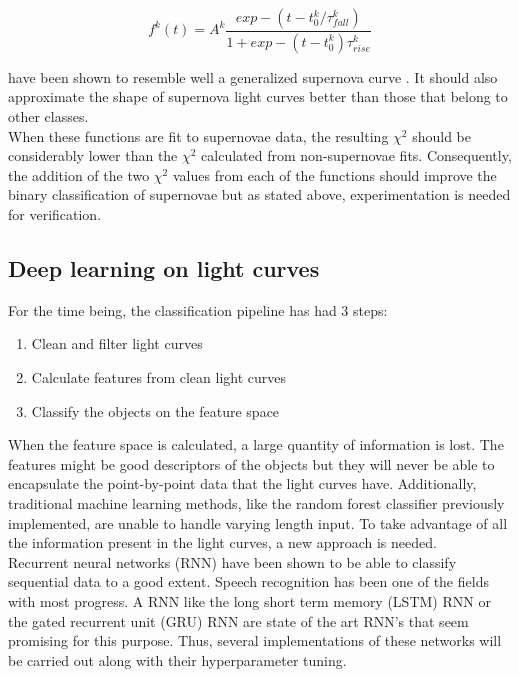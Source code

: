 \[f^k(t) = A^k \frac{exp-(t-t_0^k/\tau^k_{fall})}{1+exp-(t-t^k_0)\tau^k_{rise}}\]

have been shown to resemble well a generalized supernova curve \cite{sGaussian}. It should also approximate the shape of supernova light curves better than those that belong to other classes.\\

When these functions are fit to supernovae data, the resulting $\chi^2$ should be considerably lower than the $\chi^2$ calculated from non-supernovae fits. Consequently, the addition of the two $\chi^2$  values from each of the functions should improve the binary classification of supernovae but as stated above, experimentation is needed for verification.

\subsection{Deep learning on light curves}

For the time being, the classification pipeline has had 3 steps:

\begin{enumerate}
  \item Clean and filter light curves
  \item Calculate features from clean light curves
  \item Classify the objects on the feature space
\end{enumerate}

When the feature space is calculated, a large quantity of information is lost. The features might be good descriptors of the objects but they will never be able to encapsulate the point-by-point data that the light curves have. Additionally, traditional machine learning methods, like the random forest classifier previously implemented, are unable to handle varying length input. To take advantage of all the information present in the light curves, a new approach is needed.\\

Recurrent neural networks (RNN) have been shown to be able to classify sequential data to a good extent. Speech recognition has been one of the fields with most progress\cite{RNN}. A RNN like the long short term memory (LSTM) RNN or the gated recurrent unit (GRU) RNN are state of the art RNN's that seem promising for this purpose. Thus, several implementations of these networks will be carried out along with their hyperparameter tuning. 

